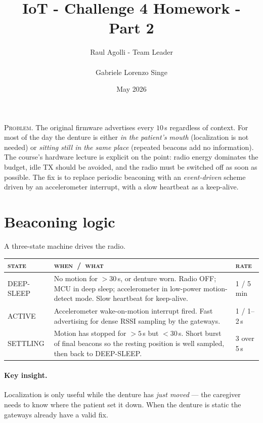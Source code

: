 \documentclass[11pt,a4paper]{article}
\title{IoT - Challenge 4 Homework - Part 2}
\author{Raul Agolli - Team Leader \\\\ Gabriele Lorenzo Singe}
\date{May 2026}
\begin{document}
\maketitle
\thispagestyle{fancy}

\noindent\textsc{Problem.}\enskip
The original firmware advertises every $10\,$s regardless of context.
For most of the day the denture is either \emph{in the patient's mouth}
(localization is not needed) or \emph{sitting still in the same place}
(repeated beacons add no information). The course's hardware lecture is
explicit on the point: radio energy dominates the budget, idle TX should
be avoided, and the radio must be switched off as soon as possible. The
fix is to replace periodic beaconing with an \emph{event-driven} scheme
driven by an accelerometer interrupt, with a slow heartbeat as a
keep-alive.

\section{Beaconing logic}

A three-state machine drives the radio.

\begin{tabularx}{\linewidth}{@{} l Y l @{}}
\toprule
\textsc{state} & \textsc{when}\ /\ \textsc{what} & \textsc{rate} \\
\midrule
\textsf{DEEP-SLEEP}
  & No motion for $>30\,$s, or denture worn. Radio OFF; MCU in deep
    sleep; accelerometer in low-power motion-detect mode. Slow
    heartbeat for keep-alive.
  & 1 / 5\,min \\
\addlinespace[2pt]
\textsf{ACTIVE}
  & Accelerometer wake-on-motion interrupt fired. Fast advertising for
    dense RSSI sampling by the gateways.
  & 1 / 1--2\,s \\
\addlinespace[2pt]
\textsf{SETTLING}
  & Motion has stopped for $>5\,$s but $<30\,$s. Short burst of final
    beacons so the resting position is well sampled, then back to
    \textsf{DEEP-SLEEP}.
  & 3 over 5\,s \\
\bottomrule
\end{tabularx}

\paragraph{Key insight.}
Localization is only useful while the denture has \emph{just moved} —
the caregiver needs to know where the patient set it down. When the
denture is static the gateways already have a valid fix.
\end{document}
